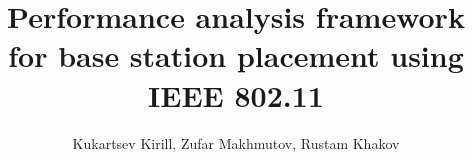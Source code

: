 \documentclass{article}
\title{Performance analysis framework for base station placement using IEEE 802.11}
\author{Kukartsev Kirill, Zufar Makhmutov, Rustam Khakov}
\begin{document}
	\maketitle
	
	\newpage
	
	\tableofcontents

	

	\newpage
	
	
	
	
	
	
	
			
	
			
	
	
	
	
	
	\begin{appendix}
		\listoffigures
		\listoftables
	\end{appendix}
	
\end{document}
